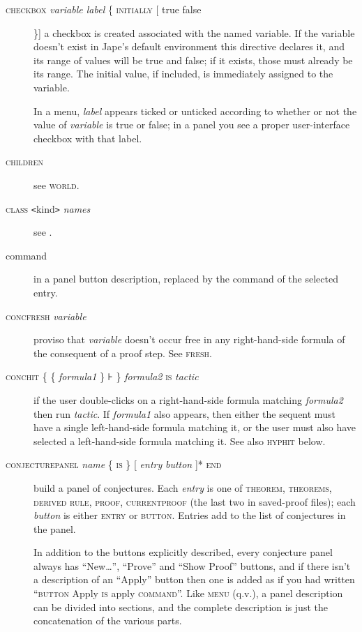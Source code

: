 \begin{description}
\item[\textsc{checkbox} \textit{variable label} \{ \textsc{initially [} true {\textbar} false ] \}] a checkbox is created associated with the named variable. If the variable doesn't exist in Jape's default environment this directive declares it, and its range of values will be true and false; if it exists, those must already be its range. The initial value, if included, is immediately assigned to the variable.

In a menu, \textit{label} appears ticked or unticked according to whether or not the value of \textit{variable} is true or false; in a panel you see a proper user-interface checkbox with that label.

\item[\textsc{children}] see \textsc{world}. 

\item[\textsc{class}  \texttt{<}kind\texttt{>} \textit{names}] see .

\item[command] in a panel button description, replaced by the command of the selected entry.

\item[\textsc{concfresh} \textit{variable}] proviso that \textit{variable} doesn't occur free in any right-hand-side formula of the consequent of a proof step. See \textsc{fresh}.

\item[\textsc{conchit} \{ \{ \textit{formula1} \} ⊦ \} \textit{formula2} \textsc{is} \textit{tactic}] if the user double-clicks on a right-hand-side formula matching \textit{formula2} then run \textit{tactic}. If \textit{formula1} also appears, then either the sequent must have a single left-hand-side formula matching it, or the user must also have selected a left-hand-side formula matching it. See also \textsc{hyphit} below.

\item[\textsc{conjecturepanel} \textit{name} \{ \textsc{is} \} {[} \textit{entry} {\textbar} \textit{button} {]}* \textsc{end}] build a panel of conjectures. Each \textit{entry} is one of \textsc{theorem, theorems, derived rule, proof, currentproof} (the last two in saved-proof files); each \textit{button} is either \textsc{entry} or \textsc{button}. Entries add to the list of conjectures in the panel. 

In addition to the buttons explicitly described, every conjecture panel always has ``New\dots'', ``Prove'' and ``Show Proof'' buttons, and if there isn't a description of an ``Apply'' button then one is added as if you had written ``\textsc{button} Apply \textsc{is} apply \textsc{command}''. Like \textsc{menu} (q.v.), a panel description can be divided into sections, and the complete description is just the concatenation of the various parts.


\end{description}
